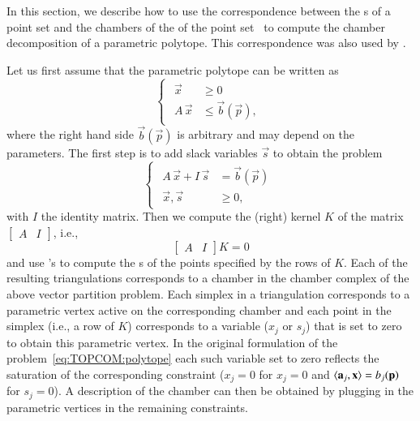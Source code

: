 In this section, we describe how to use the correspondence
between the s of a point set
and the chambers of the 
of the point set~
to compute the chamber decomposition of a parametric polytope.
This correspondence was also used by 
.

Let us first assume that the parametric polytope can be written as
\begin{equation}
\label{eq:TOPCOM:polytope}
\begin{cases}
    \begin{aligned}
\vec x &\ge 0
\\
A \, \vec x &\le \vec b(\vec p)
,
    \end{aligned}
\end{cases}
\end{equation}
where the right hand side $\vec b(\vec p)$ is arbitrary and
may depend on the parameters.
The first step is to add slack variables $\vec s$ to obtain
the  problem
$$
\begin{cases}
    \begin{aligned}
A \, \vec x + I \, \vec s & = \vec b(\vec p)
\\
\vec x, \vec s &\ge 0
,
    \end{aligned}
\end{cases}
$$
with $I$ the identity matrix.
Then we compute the (right) kernel $K$ of the matrix
$\begin{bmatrix}
A & I
\end{bmatrix}$, i.e.,
$$
\begin{bmatrix}
A & I
\end{bmatrix}
K
=
0
$$
and use 's  to
compute the s of the points specified
by the rows of $K$.
Each of the resulting triangulations corresponds to a chamber
in the chamber complex of the above vector partition problem.
Each simplex in a triangulation corresponds to a parametric
vertex active on the corresponding chamber and
each point in the simplex (i.e., a row of $K$) corresponds
to a variable ($x_j$ or $s_j$) that is set to zero to obtain
this parametric vertex.
In the original formulation of the problem~\eqref{eq:TOPCOM:polytope}
each such variable set to zero reflects the saturation of the
corresponding constraint ($x_j = 0$ for $x_j = 0$ and
$\sps {\vec a_j}{\vec x} = b_j(\vec p)$ for $s_j = 0$).
A description of the chamber can then be obtained by plugging
in the parametric vertices in the remaining constraints.

